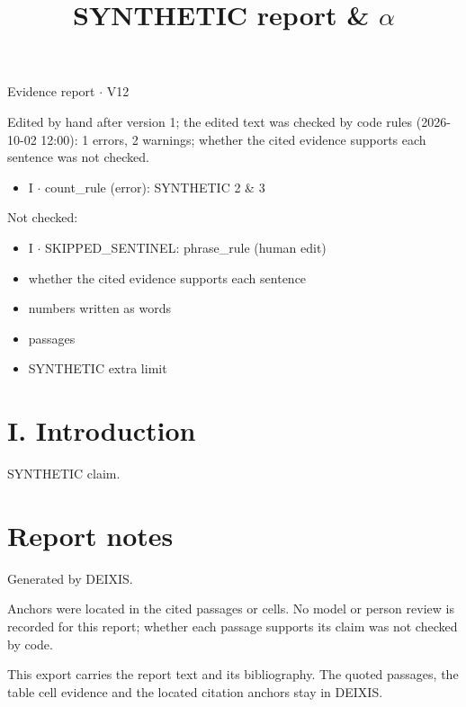 \documentclass[journal]{IEEEtran}
\begin{document}
\title{SYNTHETIC report \& \ensuremath{\alpha}}

\maketitle

\noindent Evidence report \ensuremath{\cdot} V12

\noindent Edited by hand after version 1; the edited text was checked by code rules (2026-10-02 12:00): 1 errors, 2 warnings; whether the cited evidence supports each sentence was not checked.

\begin{itemize}
\item I \ensuremath{\cdot} count\_rule (error): SYNTHETIC 2 \& 3
\end{itemize}

\noindent Not checked:

\begin{itemize}
\item I \ensuremath{\cdot} SKIPPED\_SENTINEL: phrase\_rule (human edit)
\item whether the cited evidence supports each sentence
\item numbers written as words
\item passages
\item SYNTHETIC extra limit
\end{itemize}

\section*{I. Introduction}

SYNTHETIC claim. \cite{Synth26}

\section*{Report notes}

Generated by DEIXIS.

Anchors were located in the cited passages or cells. No model or person review is recorded for this report; whether each passage supports its claim was not checked by code.

This export carries the report text and its bibliography. The quoted passages, the table cell evidence and the located citation anchors stay in DEIXIS.




\end{document}

